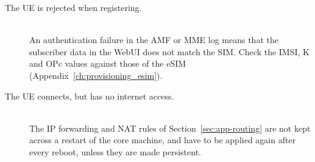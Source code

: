 \begin{description}
    \item[The \gls{UE} is rejected when registering.]~\\
    An authentication failure in the \gls{AMF} or \gls{MME} log means that the subscriber data in the WebUI does not match the SIM. Check the \gls{IMSI}, K and OPc values against those of the eSIM (Appendix~\ref{ch:provisioning_esim}).

    \item[The \gls{UE} connects, but has no internet access.]~\\
    The IP forwarding and NAT rules of Section~\ref{sec:app-routing} are not kept across a restart of the core machine, and have to be applied again after every reboot, unless they are made persistent.
\end{description}